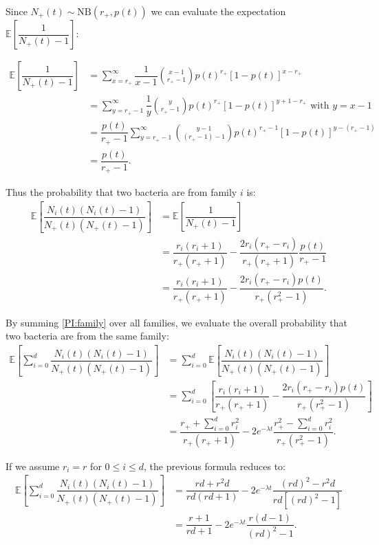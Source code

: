 \documentclass{article}
\begin{document}
Since $N_+(t) \sim \textrm{NB} (r_+, p(t))$ we can evaluate the expectation $\mathbb{E}\left[\dfrac{1}{N_+(t)-1} \right]$:

\begin{align}
\mathbb{E}\left[\dfrac{1}{N_+(t)-1} \right] &= \sum_{x=r_+}^{\infty } \dfrac{1}{x-1} \binom{x-1}{r_+-1} p(t)^{r_+} [1-p(t)]^{x-r_+} \\
 &=\sum_{y=r_+-1}^{\infty} \dfrac{1}{y} \binom{y}{r_+-1} p(t)^{r_+} [1-p(t)]^{y+1-r_+} \text{ with }y=x-1\\
 &=\dfrac{p(t)}{r_+-1}\sum_{y=r_+-1}^{\infty}\binom{y-1}{(r_+-1)-1} p(t)^{r_+-1} [1-p(t)]^{y-(r_+-1)} \\
 &=\dfrac{p(t)}{r_+-1}.
\end{align}

Thus the probability that two bacteria are from family $i$ is:
\begin{align}
\mathbb{E}\left[ \dfrac{N_i(t)(N_i(t)-1)}{N_+(t) ( N_+(t)-1 )} \right] &= \mathbb{E}\left[\dfrac{1}{N_+(t)-1} \right]\\
 &=\dfrac{r_i(r_i+1)}{r_+ (r_+ +1 )}-\dfrac{2 r_i (r_+ -r_{i})}{r_+ (r_+ +1 )}\dfrac{p(t)}{r_+-1}\\
 &=\dfrac{r_i(r_i+1)}{r_+ (r_+ +1 )}-\dfrac{2 r_i (r_+ -r_{i})p(t)}{r_+ (r_+^2 -1 )}. \label{PI:family}
\end{align}


By summing \eqref{PI:family} over all families, we evaluate the overall probability that two bacteria are from the same family:
\begin{align}
\mathbb{E}\left[ \displaystyle \sum_{i=0}^d \dfrac{N_i(t)(N_i(t)-1)}{N_+(t)(N_+(t)-1)} \right] &= \displaystyle \sum_{i=0}^d \mathbb{E}\left[  \dfrac{N_i(t)(N_i(t)-1)}{N_+(t)( N_+(t)-1 ) } \right]\\
&= \displaystyle \sum_{i=0}^d \left[ \dfrac{r_i(r_i+1)}{r_+ (r_+ +1 )}-\dfrac{2 r_i (r_+ -r_{i})p(t)}{r_+ (r_+^2 -1 )} \right] \\
&=    \dfrac{ r_+ + \sum_{i=0}^d r_i^2}{r_+ (r_+ +1)}  -2 e^{-\lambda t} \dfrac{ r_+^2-\sum_{i=0}^d r_i^2}{r_+ (r_+^2 -1) }. \label{PI}
\end{align}

If we assume $r_i=r$ for $0 \leq i \leq d$, the previous formula reduces to:
\begin{align}
\mathbb{E}\left[ \displaystyle \sum_{i=0}^d \dfrac{N_i(t)(N_i(t)-1)}{N_+(t)\left(N_+(t)-1 \right)} \right] &=
 \dfrac{ rd + r^2 d}{rd (rd +1)}  -2 e^{-\lambda t} \dfrac{ (rd)^2-r^2d}{rd [(rd)^2 -1] }\\
 &= \dfrac{r+1}{rd+1}  -2e^{-\lambda t} \dfrac{r(d-1)}{(rd)^2 -1 }.
\end{align}
\end{document}
